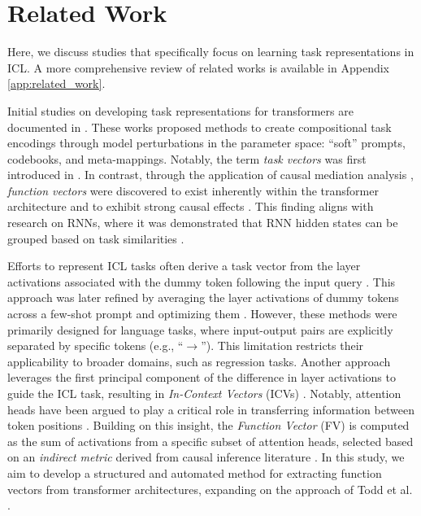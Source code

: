 \section{Related Work}
\label{sec:related_work_task_repr}
Here, we discuss studies that specifically focus on learning task representations in ICL. A more comprehensive review of related works is available in Appendix \ref{app:related_work}.

Initial studies on developing task representations for transformers are documented in \citep{lampinen_task_repr, shao_2023, mu_2023, panigrahi_2023, ilharco_2023}. These works proposed methods to create compositional task encodings through model perturbations in the parameter space: ``soft'' prompts, codebooks, and meta-mappings. Notably, the term \emph{task vectors} was first introduced in \citep{ilharco_2023}. In contrast, through the application of causal mediation analysis \citep{direct_and_indirect_effects, vig, meng_factual_assoc, wang_2023a, geva_2023}, \textit{function vectors} were discovered to exist inherently within the transformer architecture and to exhibit strong causal effects \citep{fv}. This finding aligns with research on RNNs, where it was demonstrated that RNN hidden states can be grouped based on task similarities \citep{lake_2018, hill_2018}.

Efforts to represent ICL tasks often derive a task vector from the layer activations associated with the dummy token following the input query \citep{icl_creates_task_vectors}. This approach was later refined by averaging the layer activations of dummy tokens across a few-shot prompt and optimizing them \citep{dongfang}. However, these methods were primarily designed for language tasks, where input-output pairs are explicitly separated by specific tokens (e.g., ``\(\rightarrow\)''). This limitation restricts their applicability to broader domains, such as regression tasks. Another approach leverages the first principal component of the difference in layer activations to guide the ICL task, resulting in \textit{In-Context Vectors} (ICVs) \citep{icv}. Notably, attention heads have been argued to play a critical role in transferring information between token positions \citep{transformer, math_of_transformers}. Building on this insight, the \textit{Function Vector} (FV) \citep{fv} is computed as the sum of activations from a specific subset of attention heads, selected based on an \emph{indirect metric} derived from causal inference literature \citep{direct_and_indirect_effects}. In this study, we aim to develop a structured and automated method for extracting function vectors from transformer architectures, expanding on the approach of Todd et al. \citep{fv}.